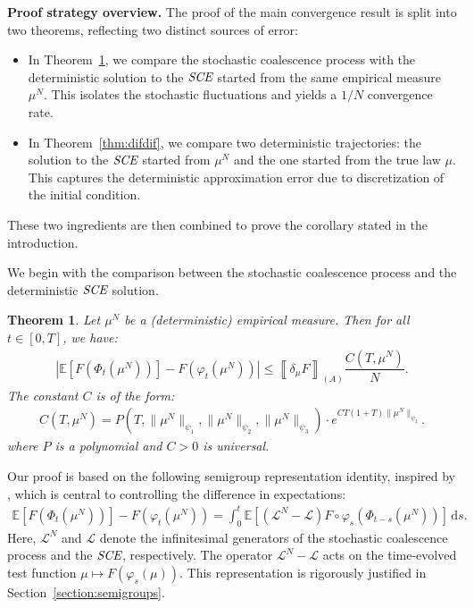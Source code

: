 \documentclass[11pt,a4paper]{article}
\newcommand{\LC}{\mathcal{L}}
\newcommand{\SCE}{\emph{SCE}}
\newcommand{\A}{(A)}
\newtheorem{theorem}{Theorem}[section]
\begin{document}
\medskip

\textbf{Proof strategy overview.} The proof of the main convergence result is split into two theorems, reflecting two distinct sources of error:

\begin{itemize}
    \item In Theorem~\ref{thm:samesame}, we compare the stochastic coalescence process with the deterministic solution to the $\SCE$ started from the same empirical measure $\mu^N$. This isolates the stochastic fluctuations and yields a $1/N$ convergence rate.
    \item In Theorem~\ref{thm:difdif}, we compare two deterministic trajectories: the solution to the $\SCE$ started from $\mu^N$ and the one started from the true law $\mu$. This captures the deterministic approximation error due to discretization of the initial condition.
\end{itemize}

These two ingredients are then combined to prove the corollary stated in the introduction.

\medskip

We begin with the comparison between the stochastic coalescence process and the deterministic $\SCE$ solution.

\begin{theorem}\label{thm:samesame}
    Let $\mu^N$ be a (deterministic) empirical measure. Then for all $t \in [0,T]$, we have:
    \begin{align*}
        \left| \mathbb{E}\left[F\left(\Phi_t(\mu^N)\right)\right] - F\left(\varphi_t(\mu^N)\right) \right| 
        \leq \left\llbracket \delta_\mu F \right\rrbracket_{\A} \dfrac{C(T,\mu^N)}{N}.
    \end{align*}
    The constant $C$ is of the form:
    \begin{align*}
        C(T,\mu^N) = P\left(T,\|\mu^N\|_{\psi_1},\|\mu^N\|_{\psi_2},\|\mu^N\|_{\psi_3}\right) 
        \cdot e^{CT(1 + T)\|\mu^N\|_{\psi_2}}.
    \end{align*}
    where $P$ is a polynomial and $C > 0$ is universal.
\end{theorem}

Our proof is based on the following semigroup representation identity, inspired by \cite{kolokoltsov2010central}, which is central to controlling the difference in expectations:
\begin{align}\label{eq:semi-group-relation}
    \mathbb{E}\left[F(\Phi_t(\mu^N))\right] - F(\varphi_t(\mu^N)) 
    = \int_0^t \mathbb{E}\left[\left(\LC^N - \LC\right)F\circ \varphi_s\left(\Phi_{t-s}(\mu^N)\right)\right]\, \mathrm{d}s.
\end{align}
Here, $\LC^N$ and $\LC$ denote the infinitesimal generators of the stochastic coalescence process and the $\SCE$, respectively. The operator $\LC^N - \LC$ acts on the time-evolved test function $\mu \mapsto F(\varphi_s(\mu))$. This representation is rigorously justified in Section~\ref{section:semigroups}.
\end{document}
